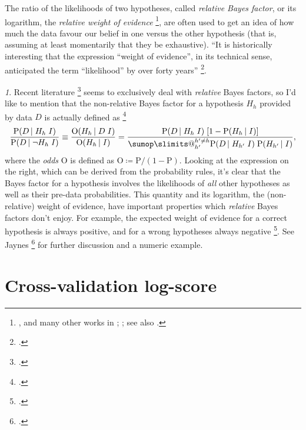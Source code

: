 \documentclass[\ifafour a4paper,12pt,\else a5paper,10pt,\fi%
onecolumn,oneside,article,%
british%
]{memoir}
\makeatletter
\theoremstyle{remark}
\theoremstyle{innote}
\newtheorem*{innote}{}
\def\sum{\DOTSI\sumop\slimits@}
\newcommand*{\citep}{\footcites}
\newcommand*{\citey}{\footcites}%
\newcommand*{\defd}{\coloneqq}
\newcommand*{\p}{\mathrm{P}}%
\renewcommand*{\|}[1][]{\nonscript\,#1\vert\nonscript\;\mathopen{}}
\newcommand*{\sect}{\S}%
\newcommand*{\sects}{\S\S}%
\newcommand*{\chap}{ch.}%
\newcommand*{\chaps}{chs}%
\newcommand*{\yK}{I}
\newcommand*{\yO}{\mathrm{O}}
\makeatother
\begin{document}
The ratio of the likelihoods of two hypotheses, called \emph{relative Bayes
  factor}, or its logarithm, the \emph{relative weight of evidence}
\footnote{\cites[\chap~6]{good1950}{good1975,good1981,good1985}, and many
  other works in \cite{good1983};
  \cites[\sect~1.4]{osteyeeetal1974}{mackay1992,kassetal1995}; see
  also \cite[\chaps~V, VI, A]{jeffreys1939_r1983}.}, are often used to get an
idea of how much the data favour our belief in one versus the other
hypothesis (that is, assuming at least momentarily that they be
exhaustive). \enquote{It is historically interesting that the expression
  ``weight of evidence'', in its technical sense, anticipated the term
  ``likelihood'' by over forty years} \citep[\sect~1.4.2
p.~12]{osteyeeetal1974}.
\begin{innote}
  Recent literature \citep[for example][]{kassetal1995} seems to
  exclusively deal with \emph{relative} Bayes factors, so I'd like to
  mention that the non-relative Bayes factor for a hypothesis $H_{h}$
  provided by data $D$ is actually defined as \citep[\sect~2]{good1981}
  \begin{equation}
    \label{eq:proper_Bayes_factor}
    \frac{\p(D \| H_{h} \; \yK)}{\p(D \| \lnot H_{h} \; \yK)} \equiv
    \frac{\yO(H_{h} \| D \; \yK)}{\yO(H_{h} \| \yK)} =
    \frac{\p(D \| H_{h}\; \yK)\; [1- \p(H_{h} \| \yK)]}{
\sum_{h'}^{h' \ne h} \p(D \| H_{h'} \; \yK) \; \p(H_{h'} \| \yK)
    },
  \end{equation}
  where the \emph{odds} $\yO$ is defined as $\yO \defd \p/(1-\p)$. Looking
  at the expression on the right, which can be derived from the probability
  rules, it's clear that the Bayes factor for a hypothesis involves the
  likelihoods of \emph{all} other hypotheses as well as their pre-data
  probabilities. This quantity and its logarithm, the (non-relative) weight
  of evidence, have important properties which \emph{relative} Bayes factors
  don't enjoy. For example, the expected weight of evidence for a correct
  hypothesis is always positive, and for a wrong hypotheses always negative
  \citep[\sect~6.7]{good1950}. See Jaynes
  \citey[\sects~4.3--4.4]{jaynes1994_r2003} for further discussion and a
  numeric example.
\end{innote}

\section{Cross-validation log-score}
\label{sec:logscore}
\end{document}
